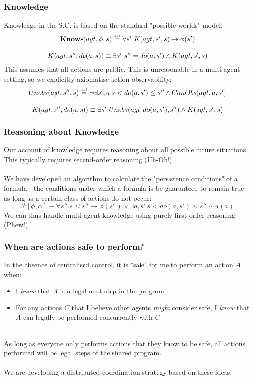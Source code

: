 \documentclass{beamer}
\newcommand{\isdef}{\hbox{$\stackrel{\mbox{\tiny def}}{=}$}}
\begin{document}
\begin{frame}
\frametitle{Knowledge}
Knowledge in the S.C. is based on the standard "possible worlds" model:
\[
\begin{array}{c}
\mathbf{Knows}(agt,\phi,s)\ \isdef\ \forall s'\ K(agt,s',s) \rightarrow \phi(s')\\
\\
K(agt,s'',do(a,s)) \equiv \exists s'\ s''=do(a,s') \wedge K(agt,s',s)
\end{array}
\]
\pause
This assumes that all actions are public.  This is unreasonable
in a multi-agent setting, so we explicitly axiomatise action observability:
\[
\begin{array}{c}
Unobs(agt,s'',s)\ \isdef\ \neg\exists s',a\ s<do(a,s')\leq s'' \wedge CanObs(agt,a,s')\\
\\
K(agt,s'',do(a,s)) \equiv \exists s'\ Unobs(agt,do(a,s'),s'') \wedge K(agt,s',s)
\end{array}
\]

\end{frame}

\begin{frame}
\frametitle{Reasoning about Knowledge}
Our account of knowledge requires reasoning about all possible future
situations.  This typically requires second-order reasoning (Uh-Oh!)
\pause
\ \\
\ \\
We have developed an algorithm to calculate the "persistence conditions"
of a formula - the conditions under which a formula is be guaranteed to
remain true as long as a certain class of actions do not occur:
\[
\mathcal{P}[\phi,\alpha] \equiv \forall s'' . s \leq s'' \rightarrow \phi(s'') \vee \exists a,s'\ s<do(a,s')\leq s'' \wedge \alpha(a)
\]
\pause
We can thus handle multi-agent knowledge using purely first-order reasoning
(Phew!)
\end{frame}

\begin{frame}
\frametitle{When are actions safe to perform?}
In the absence of centralised control, it is "safe" for me to perform
an action $A$ when:
\begin{itemize}
  \item I \emph{know} that $A$ is a legal next step in the program
  \item For any actions $C$ that I believe other agents \emph{might} consider
safe, I \emph{know} that $A$ can legally be performed concurrently with $C$
\end{itemize}
\ \\
As long as everyone only performs actions that they know to be safe, all
actions performed will be legal steps of the shared program.
\ \\
\ \\
We are developing a distributed coordination strategy based on these ideas.
\end{frame}
\end{document}
